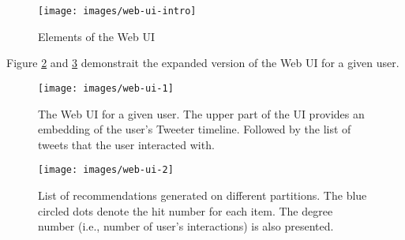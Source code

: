 \begin{figure}[!htb]
	\centering
	\texttt{[image: images/web-ui-intro]}
	\caption{Elements of the Web UI}
	\label{fig:web-ui-intro}
\end{figure}

Figure \ref{fig:web-ui-example-1} and \ref{fig:web-ui-example-2} demonstrait the expanded version of the Web UI for a given user.

\begin{figure}[!htb]
	\centering
	\texttt{[image: images/web-ui-1]}
	\caption{The Web UI for a given user. The upper part of the UI provides an embedding of the user's Tweeter timeline. Followed by the list of tweets that the user interacted with.}
	\label{fig:web-ui-example-1}
\end{figure}

\begin{figure}[!htb]
	\centering
	\texttt{[image: images/web-ui-2]}
	\caption{List of recommendations generated on different partitions. The blue circled dots denote the hit number for each item. The degree number (i.e., number of user's interactions) is also presented.}
	\label{fig:web-ui-example-2}
\end{figure}
